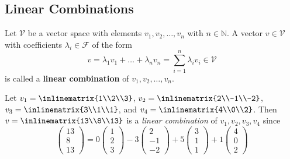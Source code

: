 \subsection{Linear Combinations}\label{subsec-linear-combinations}

\begin{definition}\label{def-linear-combinations}
	Let $\mathcal{V}$ be a vector space with elements $v_1, v_2, \dots, v_n$
	with $n\in\mathbb{N}$. A vector $v\in\mathcal{V}$ with coefficients
	$\lambda_i\in\mathcal{F}$ of the form
	\begin{equation}
		v=\lambda_1 v_1 + \dots + \lambda_n v_n = \sum_{i=1}^n \lambda_i v_i \in\mathcal{V}
	\end{equation}
	is called a \textbf{linear combination} of $v_1, v_2, \dots, v_n$.
\end{definition}

\begin{exm}
	Let $v_1=\inlinematrix{1\\2\\3}$, $v_2=\inlinematrix{2\\-1\\-2}$,
	$v_3=\inlinematrix{3\\1\\1}$, and $v_4=\inlinematrix{4\\0\\2}$. Then
	$v=\inlinematrix{13\\8\\13}$ is a \textit{linear combination} of
	$v_1,v_2,v_3,v_4$ since
	\begin{equation*}
		\begin{pmatrix}
			13 \\8\\13
		\end{pmatrix}=
		0\begin{pmatrix}
			1 \\2\\3
		\end{pmatrix}-
		3\begin{pmatrix}
			2 \\-1\\-2
		\end{pmatrix}+
		5\begin{pmatrix}
			3 \\1\\1
		\end{pmatrix}+
		1\begin{pmatrix}
			4 \\0\\2
		\end{pmatrix}
	\end{equation*}
\end{exm}

